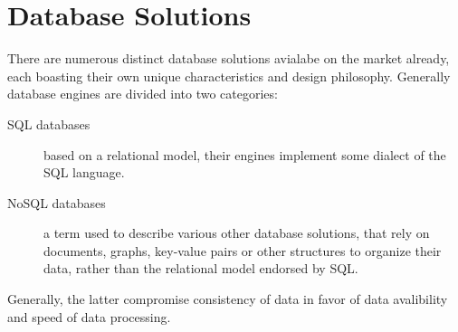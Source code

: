 \chapter{Database Solutions}
\label{ch:background}
\par There are numerous distinct database solutions avialabe on the market already, each boasting their own unique characteristics and design philosophy. Generally database engines are divided into two categories:
\begin{description}
  \item[SQL databases] based on a relational model, their engines implement some dialect of the SQL language.
  \item[NoSQL databases] a term used to describe various other database solutions, that rely on documents, graphs, key-value pairs or other structures to organize their data, rather than the relational model endorsed by SQL\citep{SQLvNOSQL}.
\end{description}

\par Generally, the latter compromise consistency of data in favor of data avalibility and speed of data processing.

%
